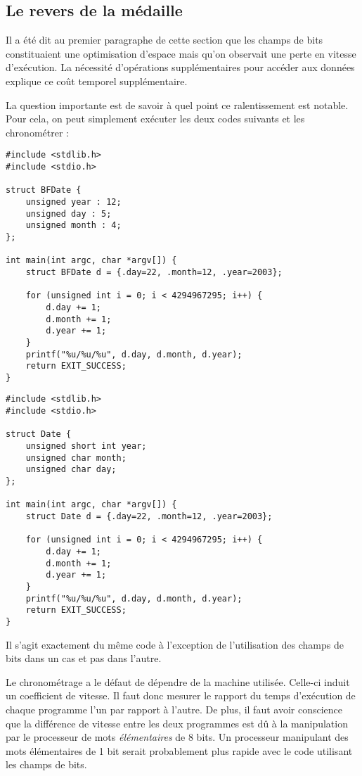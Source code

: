 \documentclass[../../../main.tex]{subfiles}
\begin{document}
\subsection{Le revers de la médaille}
\label{sub:le_revers_de_la_m_daille}
Il a été dit au premier paragraphe de cette section que les champs de bits constituaient une optimisation d'espace mais qu'on observait une perte en vitesse d'exécution. La nécessité d'opérations supplémentaires pour accéder aux données explique ce coût temporel supplémentaire.

La question importante est de savoir à quel point ce ralentissement est notable.
Pour cela, on peut simplement exécuter les deux codes suivants et les chronométrer :

\begin{minipage}{0.5\textwidth}
	\begin{verbatim}
#include <stdlib.h>
#include <stdio.h>

struct BFDate {
	unsigned year : 12;
	unsigned day : 5;
	unsigned month : 4;
};

int main(int argc, char *argv[]) {
	struct BFDate d = {.day=22, .month=12, .year=2003};

	for (unsigned int i = 0; i < 4294967295; i++) {
		d.day += 1;
		d.month += 1;
		d.year += 1;
	}
	printf("%u/%u/%u", d.day, d.month, d.year);
	return EXIT_SUCCESS;
}
	\end{verbatim}
\end{minipage}
\begin{minipage}{0.5\textwidth}
	\begin{verbatim}
#include <stdlib.h>
#include <stdio.h>

struct Date {
	unsigned short int year;
	unsigned char month;
	unsigned char day;
};

int main(int argc, char *argv[]) {
	struct Date d = {.day=22, .month=12, .year=2003};

	for (unsigned int i = 0; i < 4294967295; i++) {
		d.day += 1;
		d.month += 1;
		d.year += 1;
	}
	printf("%u/%u/%u", d.day, d.month, d.year);
	return EXIT_SUCCESS;
}
	\end{verbatim}
\end{minipage}

Il s'agit exactement du même code à l'exception de l'utilisation des champs de bits dans un cas et pas dans l'autre.

Le chronométrage a le défaut de dépendre de la machine utilisée. Celle-ci induit un coefficient de vitesse. Il faut donc mesurer le rapport du temps d'exécution de chaque programme l'un par rapport à l'autre. De plus, il faut avoir conscience que la différence de vitesse entre les deux programmes est dû à la manipulation par le processeur de mots \textit{élémentaires} de 8 bits. Un processeur manipulant des mots élémentaires de 1 bit serait probablement plus rapide avec le code utilisant les champs de bits.
\end{document}
